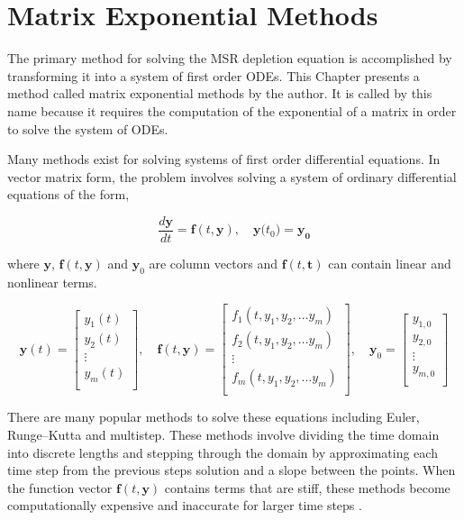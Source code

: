 \chapter{Matrix Exponential Methods}\label{ch:matrixEXPMethods}
The primary method for solving the MSR depletion equation is accomplished by transforming it into a system of first order ODEs. This Chapter presents a method called  matrix exponential methods by the author. It is called by this name because it requires the computation of the exponential of a matrix in order to solve the system of ODEs.

Many methods exist for solving systems of first order differential equations. In vector matrix form, the problem involves solving a system of ordinary differential equations of the form,

\begin{equation}
    \frac{d\boldsymbol{y}}{dt} = \boldsymbol{f}(t,\boldsymbol{y}), \quad \boldsymbol{y}({t_{0})} = \boldsymbol{y_{0}}
    \label{eq:ODE_matrix_form}
\end{equation}{}

\noindent
where $\boldsymbol{y}$, $\boldsymbol{f}(t,\boldsymbol{y})$ and $\boldsymbol{y}_{0}$ are column vectors and $\boldsymbol{f}(t,\boldsymbol{t})$ can contain linear and nonlinear terms. 

$$
\boldsymbol{y}(t) = 
\begin{bmatrix}
y_{1}(t) \\
y_{2}(t) \\
\vdots \\
y_{m}(t) \\
\end{bmatrix}, \quad 
\boldsymbol{f}(t,\boldsymbol{y}) = 
\begin{bmatrix}
f_{1}(t, y_{1}, y_{2}, \dots y_{m}) \\ 
f_{2}(t, y_{1}, y_{2}, \dots y_{m}) \\ 
\vdots \\
f_{m}(t, y_{1}, y_{2}, \dots y_{m}) \\ 
\end{bmatrix}, \quad
\boldsymbol{y}_{0} = 
\begin{bmatrix}
y_{1,0} \\
y_{2,0} \\
\vdots \\ 
y_{m,0} \\
\end{bmatrix}
$$

There are many popular methods to solve these equations including Euler, Runge–Kutta and multistep. These methods involve dividing the time domain into discrete lengths and stepping through the domain by approximating each time step from the previous steps solution and a slope between the points. When the function vector $\boldsymbol{f}(t,\boldsymbol{y})$ contains terms that are stiff, these methods become computationally expensive and inaccurate for larger time steps \cite{ash2009} \cite{ODECh82011}.


